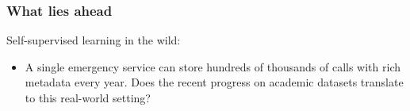 \begin{frame}
    \frametitle{What lies ahead}

    Self-supervised learning in the wild:
    \begin{itemize}
        \item A single emergency service can store hundreds of thousands of calls with rich metadata every year. Does the recent progress on academic datasets translate to this real-world setting?
    \end{itemize}
            

\end{frame}




